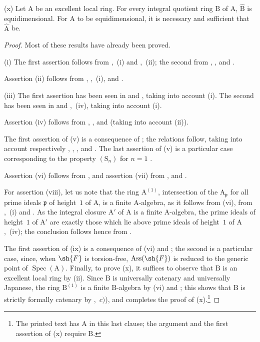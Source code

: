 \begin{scholium}[7.8.3]

(x) Let $\mathrm{A}$ be an excellent local ring. For every integral quotient ring $\mathrm{B}$ of $\mathrm{A}$, $\widehat{\mathrm{B}}$ is equidimensional. For $\mathrm{A}$ to be equidimensional, it is necessary and sufficient that $\widehat{\mathrm{A}}$ be.
\end{scholium}

\begin{proof}
Most of these results have already been proved.

(i) The first assertion follows from ,~(i) and ,~(ii); the second from , ,  and .

Assertion (ii) follows from , ,~(i),  and .

(iii) The first assertion has been seen in  and , taking into account (i). The second has been seen in  and ,~(iv), taking into account (i).

Assertion (iv) follows from , ,  and  (taking into account (ii)).

The first assertion of (v) is a consequence of ; the relations  follow, taking into account respectively , , ,  and . The last assertion of (v) is a particular case corresponding to the property $(\mathrm{S}_n)$ for $n=1$ .

Assertion (vi) follows from , and assertion (vii) from ,  and .

For assertion (viii), let us note that the ring $\mathrm{A}^{(1)}$, intersection of the $\mathrm{A}_\mathfrak{p}$ for all prime ideals $\mathfrak{p}$ of height~$1$ of $\mathrm{A}$, is a finite $\mathrm{A}$-algebra, as it follows from (vi), from ,~(i) and . As the integral closure $\mathrm{A}'$ of $\mathrm{A}$ is a finite $\mathrm{A}$-algebra, the prime ideals of height~$1$ of $\mathrm{A}'$ are exactly those which lie above prime ideals of height~$1$ of $\mathrm{A}$ ,~(iv); the conclusion follows hence from .

The first assertion of (ix) is a consequence of (vi) and ; the second is a particular case, since, when $\sh{F}$ is torsion-free, $\operatorname{Ass}(\sh{F})$ is reduced to the generic point of $\operatorname{Spec}(\mathrm{A})$. Finally, to prove (x), it suffices to observe that $\mathrm{B}$ is an excellent local ring by (ii). Since $\mathrm{B}$ is universally catenary and universally Japanese, the ring $\mathrm{B}^{(1)}$ is a finite $\mathrm{B}$-algebra by (vi) and ; this shows that $\mathrm{B}$ is strictly formally catenary by ,~$c)$), and completes the proof of (x).\footnote{The printed text has $\mathrm{A}$ in this last clause; the argument and the first assertion of (x) require $\mathrm{B}$.}
\end{proof}

